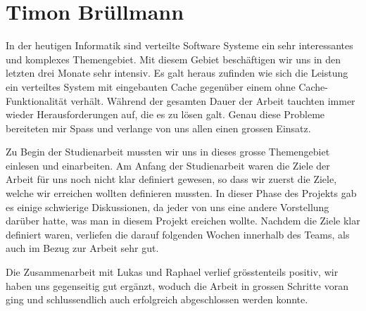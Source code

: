\section{Timon Brüllmann}

In der heutigen Informatik sind verteilte Software Systeme ein sehr interessantes und komplexes Themengebiet. Mit diesem Gebiet beschäftigen wir uns in den letzten drei Monate sehr intensiv. Es galt heraus zufinden wie sich die Leistung ein verteiltes System mit eingebauten Cache gegenüber einem ohne Cache-Funktionalität verhält. Während der gesamten Dauer der Arbeit tauchten immer wieder Herausforderungen auf, die es zu lösen galt. Genau diese Probleme bereiteten mir Spass und verlange von uns allen einen grossen Einsatz.


Zu Begin der Studienarbeit mussten wir uns in dieses grosse Themengebiet einlesen und einarbeiten. Am Anfang der Studienarbeit waren die Ziele der Arbeit für uns noch nicht klar definiert gewesen, so dass wir zuerst die Ziele, welche wir erreichen wollten definieren mussten. In dieser Phase des Projekts gab es einige schwierige Diskussionen, da jeder von uns eine andere Vorstellung darüber hatte, was man in diesem Projekt ereichen wollte. Nachdem die Ziele klar definiert waren, verliefen die darauf folgenden Wochen innerhalb des Teams, als auch im Bezug zur Arbeit sehr gut.  


Die Zusammenarbeit mit Lukas und Raphael verlief grösstenteils positiv, wir haben uns gegenseitig gut ergänzt, woduch die Arbeit in grossen Schritte voran ging und schlussendlich auch erfolgreich abgeschlossen werden konnte.

